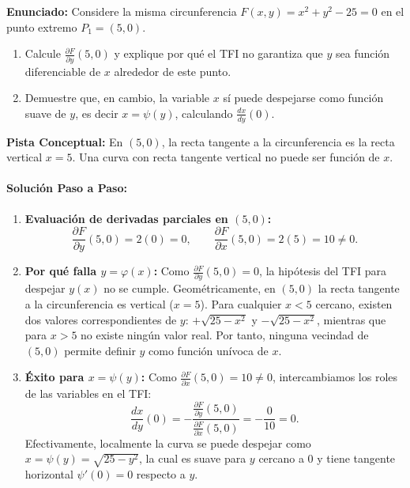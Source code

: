 \documentclass[11pt,a4paper]{article}
\begin{document}
\begin{tcolorbox}[colback=white,colframe=gray!40,arc=1mm,boxrule=0.5pt,left=3mm,right=3mm,top=2mm,bottom=2mm]
\textbf{Enunciado:} Considere la misma circunferencia $F(x,y) = x^2 + y^2 - 25 = 0$ en el punto extremo $P_1 = (5,0)$.
\begin{enumerate}[label=\textbf{\alph*)}]
\item Calcule $\frac{\partial F}{\partial y}(5,0)$ y explique por qué el TFI no garantiza que $y$ sea función diferenciable de $x$ alrededor de este punto.
\item Demuestre que, en cambio, la variable $x$ sí puede despejarse como función suave de $y$, es decir $x = \psi(y)$, calculando $\frac{dx}{dy}(0)$.
\end{enumerate}
\end{tcolorbox}

\begin{tcolorbox}[colback=yellow!4,colframe=accentamber!70,arc=1mm,boxrule=0.5pt,left=3mm,right=3mm,top=1.5mm,bottom=1.5mm]
\textbf{Pista Conceptual:} En $(5,0)$, la recta tangente a la circunferencia es la recta vertical $x = 5$. Una curva con recta tangente vertical no puede ser función de $x$.
\end{tcolorbox}

\paragraph{Solución Paso a Paso:}\par
\begin{enumerate}[label=\textbf{\arabic*.}]
\item \textbf{Evaluación de derivadas parciales en $(5,0)$:}
\[ \frac{\partial F}{\partial y}(5,0) = 2(0) = 0, \qquad \frac{\partial F}{\partial x}(5,0) = 2(5) = 10 \neq 0. \]
\item \textbf{Por qué falla $y = \varphi(x)$:}
Como $\frac{\partial F}{\partial y}(5,0) = 0$, la hipótesis del TFI para despejar $y(x)$ no se cumple. Geométricamente, en $(5,0)$ la recta tangente a la circunferencia es vertical ($x=5$). Para cualquier $x < 5$ cercano, existen dos valores correspondientes de $y$: $+\sqrt{25-x^2}$ y $-\sqrt{25-x^2}$, mientras que para $x > 5$ no existe ningún valor real. Por tanto, ninguna vecindad de $(5,0)$ permite definir $y$ como función unívoca de $x$.
\item \textbf{Éxito para $x = \psi(y)$:}
Como $\frac{\partial F}{\partial x}(5,0) = 10 \neq 0$, intercambiamos los roles de las variables en el TFI:
\[ \frac{dx}{dy}(0) = - \frac{\frac{\partial F}{\partial y}(5,0)}{\frac{\partial F}{\partial x}(5,0)} = -\frac{0}{10} = 0. \]
Efectivamente, localmente la curva se puede despejar como $x = \psi(y) = \sqrt{25 - y^2}$, la cual es suave para $y$ cercano a 0 y tiene tangente horizontal $\psi'(0) = 0$ respecto a $y$.
\end{enumerate}
\end{document}
